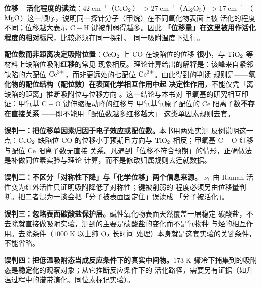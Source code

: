 \begin{infer}
\textbf{位移—活化程度的读法}：$42\;\mathrm{cm^{-1}}$（$\ce{CeO2}$）
$>27\;\mathrm{cm^{-1}}$（$\ce{Al2O3}$）$>17\;\mathrm{cm^{-1}}$
（$\ce{MgO}$）这一顺序，说明同一探针分子（甲烷）在不同氧化物表面上被
活化的程度不同；位移越大表示 $\mathrm{C{-}H}$ 键被削弱得越多。因此
\textbf{「位移量」在这里被用作活化程度的相对标尺}，比较必须在同一探针、
同一吸附温度下进行。

\textbf{配位数而非距离决定吸附位置}：$\ce{CeO2}$ 上 CO 在缺陷位的位移
\textbf{很小}，与 $\ce{TiO2}$ 等材料上缺陷位吸附\textbf{红移}的常见
现象相反。理论计算给出的解释是：该峰来自紧邻缺陷的六配位
$\ce{Ce^{3+}}$，而非更远处的七配位 $\ce{Ce^{3+}}$。由此得到的判读
规则是——\textbf{氧化物的配位结构（配位数）在表面化学相互作用中起
决定性作用}，不能仅凭「离缺陷的距离」推断吸附位与位移方向
。这一结论与本书对
甲氧基的研究相互印证：甲氧基 $\mathrm{C{-}O}$ 键伸缩振动峰的红移与
甲氧基氧原子配位的 Ce 阳离子数\textbf{不存在直接关系}
——即不能用「配位数越多红移越大」
这类单因素规则去套。
\end{infer}

\begin{pitfall}
\textbf{误判一：把位移单因素归因于电子效应或配位数。}本书用两处实测
反例说明这一点：$\ce{CeO2}$ 缺陷位 CO 的位移小于预期且方向与
$\ce{TiO2}$ 相反；甲氧基 $\mathrm{C{-}O}$ 红移与配位 Ce 阳离子数无直接
关系。凡遇到「位移不符合预期」的情形，正确做法是补做同位素实验与理论
计算，而不是修改归属规则去迁就数据。

\textbf{误判二：不区分「对称性下降」与「化学位移」两个信息来源。}
$\nu_{1}$ 由 Raman 活性变为红外活性只证明吸附降低了对称性；键被削弱的
程度必须另由位移量判断。把二者混为一谈会把「分子被表面固定住」误读成
「分子被活化」。

\textbf{误判三：忽略表面碳酸盐保护层。}碱性氧化物表面天然覆盖一层稳定
碳酸盐，不去除就直接做吸附实验，测到的主要是碳酸盐的变化而不是氧物种
与烃的相互作用。去除条件（$1000\;\mathrm{K}$ 以上纯 $\ce{O2}$ 长时间
处理）本身就是这套实验的关键条件，不能省略。

\textbf{误判四：把低温吸附态当成反应条件下的真实中间物。}$173\;\mathrm{K}$
骤冷下捕集到的吸附态是\textbf{稳定化}的观察对象；从它推断反应条件下的
活化路径，需要另有证据（如升温过程中的谱带演化、同位素标记实验）。
\end{pitfall}

